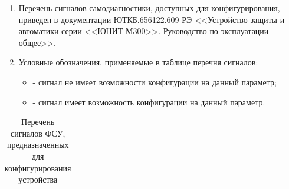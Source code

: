 
\begin{landscape}

\setlength{\footskip}{15.5pt}

\color{black}

\begin{enumerate}[label=\ref{app:signals}.\arabic*] %
  \item Перечень сигналов самодиагностики, доступных для конфигурирования, приведен в документации ЮТКБ.656122.609 РЭ <<Устройство защиты и автоматики серии <<ЮНИТ-М300>>. Руководство по эксплуатации общее>>.
  \item Условные обозначения, применяемые в таблице перечня сигналов:
  \begin{itemize}
    \item[$\text{(--)}$] { - сигнал не имеет возможности конфигурации на данный параметр;}
    \item[$\text{(+)}$] { - сигнал имеет возможность конфигурации на данный параметр.}
  \end{itemize}
\end{enumerate}

\small %
\begin{longtable}{
>{\centering\arraybackslash}m{6.0cm}
|>{\centering\arraybackslash}m{3.45cm}
|>{\centering\arraybackslash}m{2cm}
|>{\centering\arraybackslash}m{2cm}
|>{\centering\arraybackslash}m{2cm}
|>{\centering\arraybackslash}m{2cm}
|>{\centering\arraybackslash}m{2cm}
|>{\centering\arraybackslash}m{2cm}
|>{\centering\arraybackslash}m{2.107cm}
}

\caption{Перечень сигналов ФСУ, предназначенных для конфигурирования устройства\hfill\vspace{-0.5\baselineskip}}\label{appA:tbl1}\\


\end{longtable}
\end{landscape}
